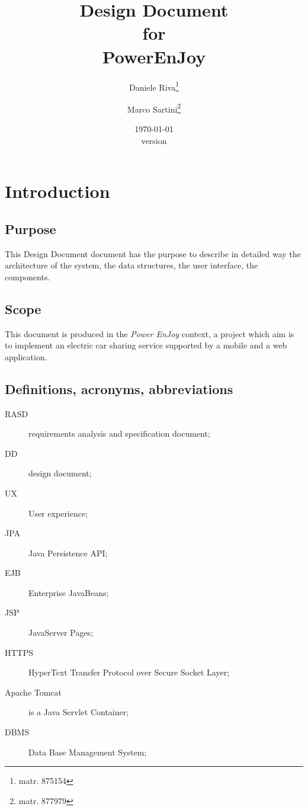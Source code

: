 \documentclass{scrreprt}
\title{Design Document\\for\\PowerEnJoy}
\date{\today\\\bigskip version \version}
\author{Daniele Riva\thanks{matr. 875154}\and Marco Sartini\thanks{matr. 877979}}
\begin{document}
\pagestyle{headings}
\maketitle

\tableofcontents

\chapter{Introduction}

\section{Purpose}
This Design Document document has the purpose to describe in detailed way the architecture of the system, the data structures, the user interface, the components.
\section{Scope}
This document is produced in the \emph{Power EnJoy} context, a project which aim is to implement an electric car sharing service supported by a mobile and a web application.
\begin{comment}
The project \emph{Power EnJoy}, which is a service based on mobile and web application, has some different targets of people:
\begin{itemize}
\item clients;
\item employee;
\end{itemize}
\end{comment}
\section{Definitions, acronyms, abbreviations}
\begin{description}
\item[RASD] requirements analysis and specification document;
\item[DD] design document;
\item[UX] User experience;
\item[JPA] Java Persistence API;
\item[EJB] Enterprise JavaBeans;
\item[JSP] JavaServer Pages;
\item[HTTPS] HyperText Transfer Protocol over Secure Socket Layer;
\item[Apache Tomcat] is a Java Servlet Container;
\item[DBMS] Data Base Management System;
\end{description}
\end{document}
